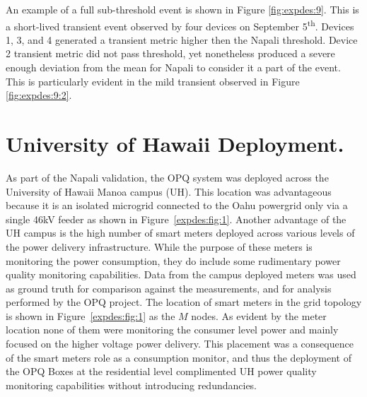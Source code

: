 An example of a full sub-threshold event is shown in Figure \ref{fig:expdes:9}.
This is a short-lived transient event observed by four devices on September 5\textsuperscript{th}.
Devices 1, 3, and 4 generated a transient metric higher then the Napali threshold.
Device 2 transient metric did not pass threshold, yet nonetheless produced a severe enough deviation from the mean for Napali to consider it a part of the event.
This is particularly evident in the mild transient observed in Figure \ref{fig:expdes:9:2}.

\section{University of Hawaii Deployment.}\label{sec:university-of-hawaii-deployment.}

As part of the Napali validation, the OPQ system was deployed across the University of Hawaii Manoa campus (UH).
This location was advantageous because it is an isolated microgrid connected to the Oahu powergrid only via a single 46kV feeder as shown in Figure~\ref{expdes:fig:1}.
Another advantage of the UH campus is the high number of smart meters deployed across various levels of the power delivery infrastructure.
While the purpose of these meters is monitoring the power consumption, they do include some rudimentary power quality monitoring capabilities.
Data from the campus deployed meters was used as ground truth for comparison against the measurements, and for analysis performed by the OPQ project.
The location of smart meters in the grid topology is shown in Figure~\ref{expdes:fig:1} as the $M$ nodes.
As evident by the meter location none of them were monitoring the consumer level power and mainly focused on the higher voltage power delivery.
This placement was a consequence of the smart meters role as a consumption monitor, and thus the deployment of the OPQ Boxes at the residential level complimented UH power quality monitoring capabilities without introducing redundancies.

